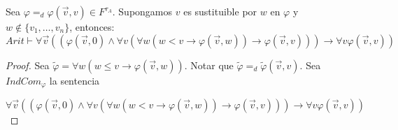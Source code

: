   \begin{lemma} \label{lemma_97}
    Sea $\varphi =_{d} \varphi(\vec{v}, v) \in F^{\tau_{A}}$. Supongamos $v$ es sustituible por $w$ en $\varphi$ y $w
    \notin \{v_{1}, \dotsc, v_{n}\}$, entonces:
    \[
      Arit \vdash \forall \vec{v}((\varphi(\vec{v}, 0) \wedge \forall v(\forall w(w < v \rightarrow \varphi(\vec{v}, w))
      \rightarrow \varphi(\vec{v} ,v))) \rightarrow \forall v\varphi(\vec{v}, v))
    \]
  \end{lemma}
  \begin{proof}
    Sea $\tilde{\varphi}=\forall w(w\leq v\rightarrow \varphi (\vec{v},w))$. Notar que $\tilde{\varphi}=_{d}\tilde{\varphi}(\vec{v},v)$. Sea $ IndCom_{\varphi }$ la sentencia

    $\displaystyle \forall \vec{v}((\varphi (\vec{v},0)\wedge \forall v(\forall w(w< v\rightarrow \varphi (\vec{v},w))\rightarrow \varphi (\vec{v} ,v)))\rightarrow \forall v\varphi (\vec{v},v)) $


\end{proof}
